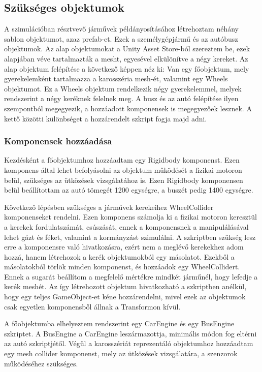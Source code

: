 \subsection{Szükséges objektumok}
A szimulációban résztvevő járművek példányosításához létrehoztam néhány sablon objektumot, azaz prefab-et. Ezek a személygépjármű és az autóbusz objektumok.
Az alap objektumokat a Unity Asset Store-ból szereztem be, ezek alapjában véve tartalmazták a mesht, egyesével elkülönítve a négy kereket. Az alap objektum felépítése a következő képpen néz ki:
Van egy főobjektum, mely gyerekelemként tartalmazza a karosszéria mesh-ét, valamint egy Wheels objektumot. Ez a Wheels objektum rendelkezik négy gyerekelemmel, melyek rendszerint a négy keréknek felelnek meg.
A busz és az autó felépítése ilyen szempontból megegyezik, a hozzáadott komponensek is megegyezőek lesznek. A kettő közötti különbséget a hozzárendelt szkript fogja majd adni.
\subsubsection{Komponensek hozzáadása}
Kezdésként a főobjektumhoz hozzáadtam egy Rigidbody komponenst. Ezen komponens által lehet befolyásolni az objektum működését a fizikai motoron belül, szükséges az ütközések vizsgálatához is. Ezen Rigidbody komponensen belül beállítottam az autó tömegét 1200 egységre, a buszét pedig 1400 egységre.

Következő lépésben szükséges a járművek kerekeihez WheelCollider komponenseket rendelni. Ezen komponens számolja ki a fizikai motoron keresztül a kerekek fordulatszámát, csúszását, ennek a komponensnek a manipulálásával lehet gázt és féket, valamint a kormányzást szimulálni. A szkriptben szükség lesz erre a komponensre való hivatkozásra, ezért nem a meglévő kerekekhez adom hozzá, hanem létrehozok a kerék objektumokból egy másolatot.
Ezekből a másolatokból törlök minden komponenst, és hozzáadok egy WheelCollidert. Ennek a sugarát beállítom a megfelelő mértékre mindkét járműnél, hogy lefedje a kerék meshét. Az így létrehozott objektum hivatkozható a szkriptben anélkül, hogy egy teljes GameObject-et kéne hozzárendelni, mivel ezek az objektumok csak egyetlen komponensből állnak a Transformon kívül.

A főobjektumba elhelyeztem rendszerint egy CarEngine és egy BusEngine szkriptet. A BusEngine a CarEngine leszármazottja, minimális módon fog eltérni az autó szkriptjétől.
Végül a karosszériát reprezentáló objektumhoz hozzáadtam egy mesh collider komponenst, mely az ütközések vizsgálatára, a szenzorok működéséhez szükséges.
